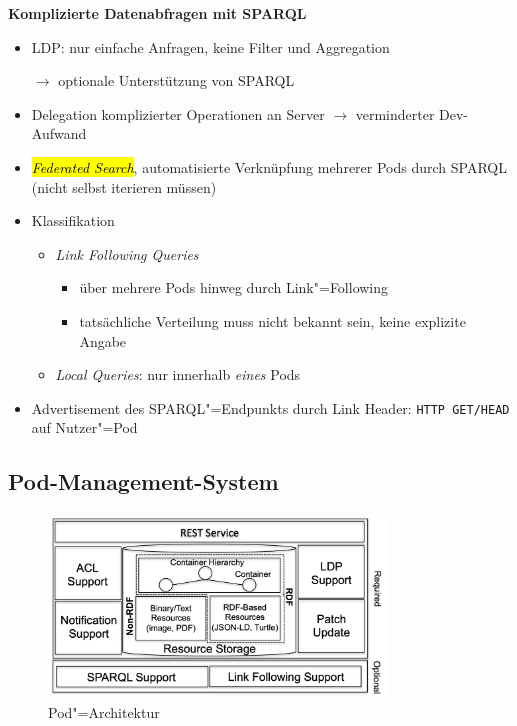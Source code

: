 \textbf{Komplizierte Datenabfragen mit SPARQL}~\cite{sambraSolidPlatformDecentralized2016}
\begin{itemize}
    \item LDP: nur einfache Anfragen, keine Filter und Aggregation
    \item[$\to$] optionale Unterstützung von SPARQL
    \item Delegation komplizierter Operationen an Server $\to$ verminderter Dev-Aufwand
    \item \hl{\emph{Federated Search}}, automatisierte Verknüpfung mehrerer Pods durch SPARQL (nicht selbst iterieren müssen)
    \item Klassifikation
    \begin{itemize}
        \item \emph{Link Following Queries}
        \begin{itemize}
            \item über mehrere Pods hinweg durch Link"=Following
            \item tatsächliche Verteilung muss nicht bekannt sein, keine explizite Angabe
        \end{itemize}
        \item \emph{Local Queries}: nur innerhalb \emph{eines} Pods
    \end{itemize}
    \item Advertisement des SPARQL"=Endpunkts durch Link Header: \texttt{HTTP GET/HEAD} auf Nutzer"=Pod
\end{itemize}


\subsection{Pod-Management-System}

\begin{figure}
    \centering
    \includegraphics[width=0.8\textwidth]{../shared/assets/sambra_pod_architecture.png}
    \caption{Pod"=Architektur~\cite{sambraSolidPlatformDecentralized2016}}
\end{figure}

